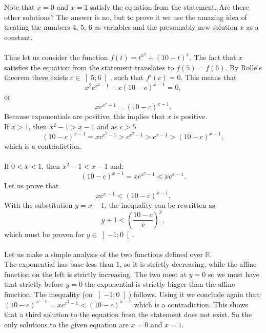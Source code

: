 \begin{solution}
    Note that \( x = 0 \) and \( x = 1 \) satisfy the equation from the statement. Are there other solutions? The answer is no, but to prove it we use the amazing idea of treating the numbers \( 4 \), \( 5 \), \( 6 \) as variables and the presumably new solution \( x \) as a constant.
    \\\\
    Thus let us consider the function \( f\left(t\right) = t^{x^{2}} + \left(10 - t\right)^{x} \). The fact that \( x \) satisfies the equation from the statement translates to \( f\left(5\right) = f\left(6\right) \). By Rolle's theorem there exists \( c \in \left]5;6\right[ \), such that \( f'\left(c\right) = 0 \). This means that
    \[
        x^{2}c^{x^{2} - 1} - x\left(10 - c\right)^{x - 1} = 0,
    \]
    or
    \[
        x c^{x^{2} - 1} = \left(10 - c\right)^{x - 1}.
    \]
    Because exponentials are positive, this implies that \( x \) is positive. \\
    If \( x > 1 \), then \( x^2-1> x-1 \) and as \( c>5 \)
    \[
        \left(10 - c\right)^{x - 1}=x c^{x^{2} - 1} > c^{x^{2} - 1} > c^{x - 1} > \left(10 - c\right)^{x - 1},
    \]
    which is a contradiction.
    \\\\
    If \( 0 < x < 1 \), then \( x^2-1<x-1 \) and:
    \[
        \left(10-c\right)^{x-1}=x c^{x^{2} - 1} < x c^{x - 1}.
    \]
    Let us prove that
    \[
        x c^{x - 1} < \left(10 - c\right)^{x - 1}.
    \]
    With the substitution \( y = x - 1 \), the inequality can be rewritten as
    \[
        y + 1 < \left(\frac{10 - c}{c}\right)^{y},
    \]
    which must be proven for \( y \in \left]-1;0\right[ \).
    \\\\
    Let us make a simple analysis of the two functions defined over \( \mathbb{R} \).\\
    The exponential has base less than \( 1 \), so it is strictly decreasing, while the affine function on the left is strictly increasing. The two meet at \( y = 0 \) so we must have that strictly before \( y=0 \) the exponential is strictly bigger than the affine function. The inequality (on \( \left]-1;0\right[ \)) follows. Using it we conclude again that: \( \left(10 - c\right)^{x - 1}=x c^{x^{2} - 1}<\left(10 - c\right)^{x - 1} \) which is a contradiction. This shows that a third solution to the equation from the statement does not exist. So the only solutions to the given equation are \( x = 0 \) and \( x = 1 \).
\end{solution}
